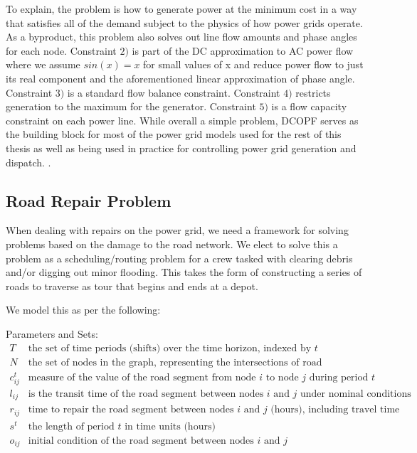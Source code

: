 \documentclass{article}
\begin{document}
To explain, the problem is how to generate power at the minimum cost in a way that satisfies all of the demand subject to the physics of how power grids operate. As a byproduct, this problem also solves out line flow amounts and phase angles for each node. Constraint $2)$ is part of the DC approximation to AC power flow where we assume $sin(x) = x$ for small values of x and reduce power flow to just its real component and the aforementioned linear approximation of phase angle. Constraint $3)$ is a standard flow balance constraint. Constraint $4)$ restricts generation to the maximum for the generator. Constraint $5)$ is a flow capacity constraint on each power line. While overall a simple problem, DCOPF serves as the building block for most of the power grid models used for the rest of this thesis as well as being used in practice for controlling power grid generation and dispatch. \cite{LiBo2007}. 
	
	
	\subsection{Road Repair Problem}
	When dealing with repairs on the power grid, we need a framework for solving problems based on the damage to the road network. We elect to solve this a problem as a scheduling/routing problem for a crew tasked with clearing debris and/or digging out minor flooding. This takes the form of constructing a series of roads to traverse as tour that begins and ends at a depot.
	
	We model this as per the following:
	
	Parameters and Sets:
	\begin{displaymath}
	\begin{array}{ll}
	T & \mbox{the set of time periods (shifts) over the time horizon, indexed by $t$}\\
	N & \mbox{the set of nodes in the graph, representing the intersections of road segments}\\
	c_{ij}^t & \mbox{measure of the value of the road segment from node $i$ to node $j$ during period $t$}\\
	l_{ij} & \mbox{is the transit time of the road segment between nodes $i$ and $j$ under nominal conditions}\\
	r_{ij} & \mbox{time to repair the road segment between nodes $i$ and $j$ (hours), including travel time}\\
	s^t & \mbox{the length of period $t$ in time units (hours)}\\
	o_{ij} & \mbox{initial condition of the road segment between nodes $i$ and $j$}\\
	\end{array}
	\end{displaymath}
	
\end{document}
